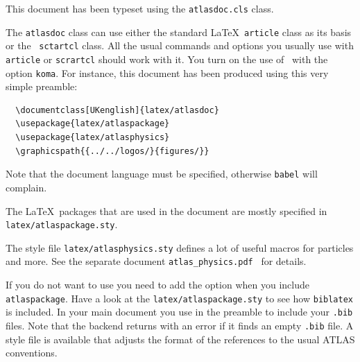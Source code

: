 This document has been typeset using the \texttt{atlasdoc.cls} class.

The \texttt{atlasdoc} class can use either the standard \LaTeX\ \texttt{article} class
as its basis or the \KOMAScript\ \texttt{sctartcl} class.
All the usual commands and options you usually use
with \texttt{article}  or \texttt{scrartcl} should work with it. 
You turn on the use of \KOMAScript\ with the option \texttt{koma}.
For instance, this document has
been produced using this very simple preamble:
%
\begin{verbatim}
  \documentclass[UKenglish]{latex/atlasdoc}
  \usepackage{latex/atlaspackage}
  \usepackage{latex/atlasphysics}
  \graphicspath{{../../logos/}{figures/}}
\end{verbatim}
%
Note that the document language must be specified, otherwise \texttt{babel} will complain.

The \LaTeX\ packages that are used in the document are mostly specified in 
\texttt{latex/atlaspackage.sty}.

The style file \texttt{latex/atlasphysics.sty} defines a lot of useful
macros for particles and more. See the separate document
\texttt{atlas\_physics.pdf}~\cite{atlas-physics} for details.

If you do not want to use  you need to add the option  when you
include \texttt{atlaspackage}.
Have a look at the \texttt{latex/atlaspackage.sty} to see how \texttt{biblatex} is included.
In your main document you use  in the preamble to include your \texttt{.bib} files.
Note that the backend  returns with an error if it finds an empty \texttt{.bib} file.
A style file  is available that adjusts the format of the references to the usual ATLAS conventions.

